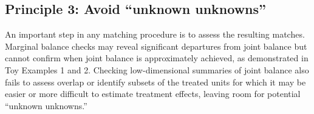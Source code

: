 \documentclass{article}
\begin{document}

\subsection{Principle 3: Avoid ``unknown unknowns''}

An important step in any matching procedure is to assess the resulting matches.
Marginal balance checks may reveal significant departures from joint balance but cannot confirm when joint balance is approximately achieved, as demonstrated in Toy Examples 1 and 2.
Checking low-dimensional summaries of joint balance also fails to assess overlap or identify subsets of the treated units for which it may be easier or more difficult to estimate treatment effects, leaving room for potential ``unknown unknowns.''
\end{document}
